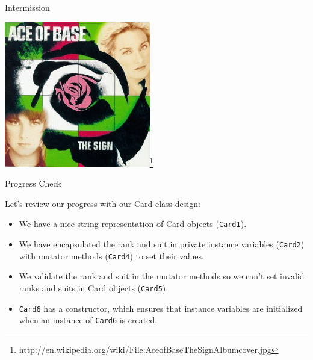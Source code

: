 \documentclass{beamer}
\begin{document}
\begin{frame}[fragile]{Intermission}


\begin{center}
\includegraphics[height=2.5in]{AceofBaseTheSignAlbumcover.jpg}\footnote{http://en.wikipedia.org/wiki/File:AceofBaseTheSignAlbumcover.jpg}
\end{center}


\end{frame}

\begin{frame}[fragile]{Progress Check}


Let's review our progress with our Card class design:
\begin{itemize}
\item We have a nice string representation of Card objects ({\tt Card1}).
\item We have encapsulated the rank and suit in private instance variables ({\tt Card2}) with mutator methods ({\tt Card4}) to set their values.
\item We validate the rank and suit in the mutator methods so we can't set invalid ranks and suits in Card objects ({\tt Card5}).
  \item {\tt Card6} has a constructor, which ensures that instance variables are initialized when an instance of {\tt Card6} is created.
\end{itemize}


\end{frame}
\end{document}
